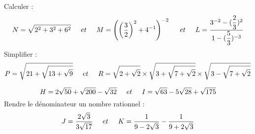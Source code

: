 \documentclass[a4paper,addpoints,12pt]{exam}
\begin{document}
\begin{exo}
\begin{questions}
\question Calculer :
\[
N=\sqrt{2^{2}+3^{2}+6^{2}}\hspace*{0.5cm}et\hspace*{0.5cm}
M=\left( \left( \dfrac{3}{2}\right)^{2}+4^{-1}\right)^{-2}  \hspace*{0.5cm}et\hspace*{0.5cm}
L=\dfrac{3^{-2}-(\dfrac{2}{3})^{2}}{1-(\dfrac{5}{3})^{-3}}
\]
\question Simplifier :
\[
P=\sqrt{21+\sqrt{13+\sqrt{9}}}\hspace*{0.5cm}et\hspace*{0.5cm}
R=\sqrt{2+\sqrt{2}}\times \sqrt{3+\sqrt{7+\sqrt{2}}}\times \sqrt{3-\sqrt{7+\sqrt{2}}}
\]

\[
H=2\sqrt{50}+\sqrt{200}-\sqrt{32}\hspace*{0.5 cm}et\hspace*{0.5 cm}
I=\sqrt{63}-5\sqrt{28}+\sqrt{175}
\]
\question Rendre le dénominateur un nombre rationnel :
\[
J=\dfrac{2\sqrt{3}}{3\sqrt{17}}\hspace*{0.5 cm}et\hspace*{0.5 cm}
K=\dfrac{1}{9-2\sqrt{3}}-\dfrac{1}{9+2\sqrt{3}}
\]
\end{questions}
\end{exo}
\end{document}
